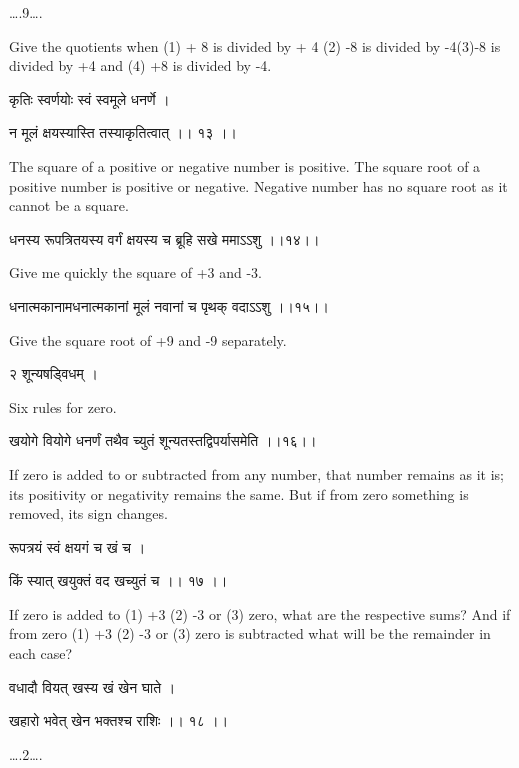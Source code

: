 \documentclass[]{article}
\date{}
\begin{document}
{\ldots{}.9\ldots{}.}

{Give the quotients when (1) + 8 is divided by + 4 (2) -8 is divided by
-4(3)-8 is divided by +4 and (4) +8 is divided by -4.}

{कृतिः स्वर्णयोः स्वं स्वमूले धनर्णे । }

{न मूलं क्षयस्यास्ति तस्याकृतित्वात् ।। १३ ।। }

{The square of a positive or negative number is positive. The square
root of a positive number is positive or negative. Negative number has
no square root as it cannot be a square.}

{धनस्य रूपत्रितयस्य वर्गं क्षयस्य च ब्रूहि सखे ममाऽऽशु ।।१४।।}

{Give me quickly the square of +3 and -3.}

{धनात्मकानामधनात्मकानां मूलं नवानां च पृथक् वदाऽऽशु ।।१५।। }

{Give the square root of +9 and -9 separately.}

{२ शून्यषड्विधम् ।}

{Six rules for zero.}

{खयोगे वियोगे धनर्णं तथैव च्युतं शून्यतस्तद्विपर्यासमेति ।।१६।। }

{If zero is added to or subtracted from any number, that number remains
as it is; its positivity or negativity remains the same. But if from
zero something is removed, its sign changes. }

{रूपत्रयं स्वं क्षयगं च खं च । }

{किं स्यात् खयुक्तं वद खच्युतं च ।। १७ ।। }

{If zero is added to (1) +3 (2) -3 or (3) zero, what are the respective
sums? And if from zero (1) +3 (2) -3 or (3) zero is subtracted what will
be the remainder in each case?}

{वधादौ वियत् खस्य खं खेन घाते । }

{खहारो भवेत् खेन भक्तश्च राशिः ।। १८ ।। }

{\ldots{}.2\ldots{}.\\
}
\end{document}
